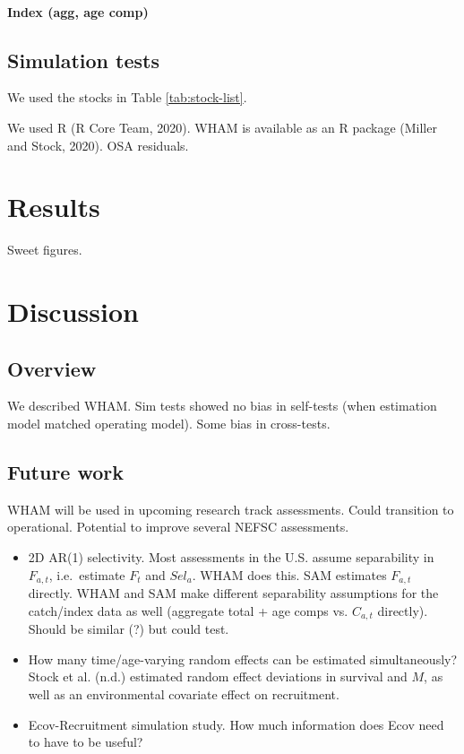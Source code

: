 \documentclass[]{article}
\providecommand{\tightlist}{%
  \setlength{\itemsep}{0pt}\setlength{\parskip}{0pt}}
\let\oldparagraph\paragraph
\renewcommand{\paragraph}[1]{\oldparagraph{#1}\mbox{}}
\begin{document}
\hypertarget{index-agg-age-comp}{%
\paragraph{Index (agg, age comp)}\label{index-agg-age-comp}}

\hypertarget{simulation-tests}{%
\subsection{Simulation tests}\label{simulation-tests}}

We used the stocks in Table \ref{tab:stock-list}.

We used R (R Core Team, 2020). WHAM is available as an R package (Miller
and Stock, 2020). OSA residuals.

\hypertarget{results}{%
\section{Results}\label{results}}

Sweet figures.

\hypertarget{discussion}{%
\section{Discussion}\label{discussion}}

\hypertarget{overview-1}{%
\subsection{Overview}\label{overview-1}}

We described WHAM. Sim tests showed no bias in self-tests (when
estimation model matched operating model). Some bias in cross-tests.

\hypertarget{future-work}{%
\subsection{Future work}\label{future-work}}

WHAM will be used in upcoming research track assessments. Could
transition to operational. Potential to improve several NEFSC
assessments.

\begin{itemize}
\tightlist
\item
  2D AR(1) selectivity. Most assessments in the U.S. assume separability
  in \(F_{a,t}\), i.e.~estimate \(F_t\) and \(Sel_a\). WHAM does this.
  SAM estimates \(F_{a,t}\) directly. WHAM and SAM make different
  separability assumptions for the catch/index data as well (aggregate
  total + age comps vs. \(C_{a,t}\) directly). Should be similar (?) but
  could test.
\item
  How many time/age-varying random effects can be estimated
  simultaneously? Stock et al. (n.d.) estimated random effect deviations
  in survival and \(M\), as well as an environmental covariate effect on
  recruitment.
\item
  Ecov-Recruitment simulation study. How much information does Ecov need
  to have to be useful?
\end{itemize}
\end{document}
